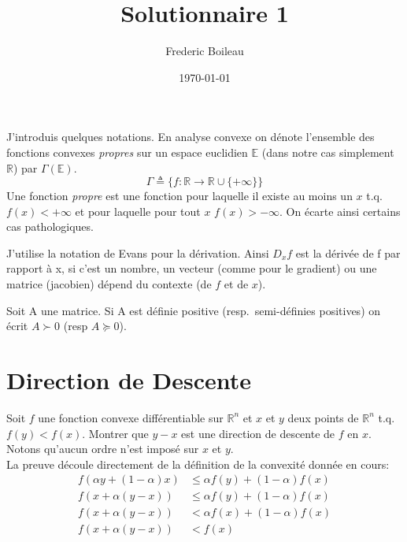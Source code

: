 

\renewcommand{\familydefault}{\sfdefault}
\usepackage{titling}
\usepackage[backend=biber,citestyle=authoryear,style=ieee]{biblatex}
\usepackage{amsmath}
\usepackage{fancyhdr}
\pagestyle{fancy}

\title{Solutionnaire 1}
\author{Frederic Boileau}
\date{\today}




\fancyhf{}
\maketitle
\thispagestyle{fancy}

J'introduis quelques notations. En analyse convexe on dénote l'ensemble
des fonctions convexes \emph{propres} sur un espace euclidien $\mathbb E$
(dans notre cas simplement $\mathbb R$) par $\Gamma (\mathbb E)$.
\begin{equation*}
    \Gamma \triangleq \{f : \mathbb R \rightarrow \mathbb R \cup \{+\infty\}\}
\end{equation*}
Une fonction \emph{propre} est une fonction pour laquelle il existe au moins un
$x$ t.q. $f(x) < + \infty $ et pour laquelle pour tout $x$ $f(x) > -\infty$. 
On écarte ainsi certains cas pathologiques.

J'utilise la notation de Evans pour la d\'erivation. Ainsi $D_x f$ 
est la d\'eriv\'ee de f par rapport \`a x, si c'est un nombre, un vecteur
(comme pour le gradient) ou une matrice (jacobien) d\'epend du contexte
(de $f$ et de $x$). 

Soit A une matrice. Si A est d\'efinie positive  (resp.\  semi-d\'efinies
positives) on \'ecrit $A \succ 0$ (resp $A \succeq 0$).

\section{Direction de Descente}

Soit $f$ une fonction convexe différentiable sur $\mathbb R^n$ 
et $x$ et $y$ deux points de $\mathbb R^n$ t.q. $f(y) < f(x)$.
Montrer que $y-x$ est une direction de descente de $f$ en $x$.
Notons qu'aucun ordre n'est impos\'e  sur $x$ et $y$.\\

La preuve d\'ecoule directement de la d\'efinition de la 
convexit\'e donn\'ee en cours:
\begin{align*}
    f(\alpha y + (1-\alpha)x) &\leq \alpha f(y) + (1-\alpha)f(x)\\
    f(x + \alpha(y-x)) &\leq \alpha f(y) + (1-\alpha)f(x)\\
    f(x + \alpha(y-x)) &< \alpha f(x) + (1-\alpha)f(x)\\
    f(x + \alpha(y-x)) &< f(x)
\end{align*}

